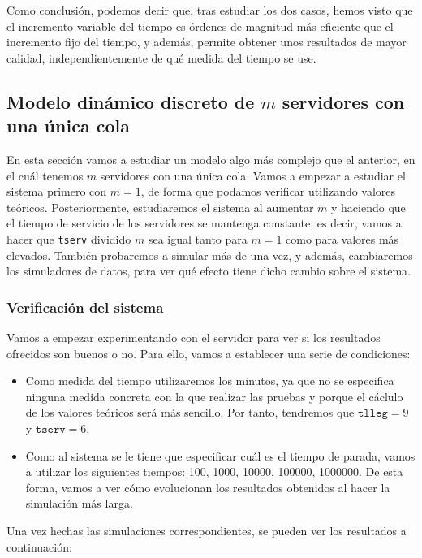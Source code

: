 \documentclass[11pt,a4paper]{article}
\begin{document}
Como conclusión, podemos decir que, tras estudiar los dos casos, hemos visto
que el incremento variable del tiempo es órdenes de magnitud más eficiente
que el incremento fijo del tiempo, y además, permite obtener unos resultados
de mayor calidad, independientemente de qué medida del tiempo se use.

\subsection{Modelo dinámico discreto de $m$ servidores con una única cola}

En esta sección vamos a estudiar un modelo algo más complejo que el anterior,
en el cuál tenemos $m$ servidores con una única cola. Vamos a empezar a estudiar
el sistema primero con $m=1$, de forma que podamos verificar utilizando valores
teóricos. Posteriormente, estudiaremos el sistema al aumentar $m$ y haciendo
que el tiempo de servicio de los servidores se mantenga constante; es decir,
vamos a hacer que \texttt{tserv} dividido $m$ sea igual tanto para $m=1$ como
para valores más elevados. También probaremos a simular más de una vez, y además,
cambiaremos los simuladores de datos, para ver qué efecto tiene dicho cambio
sobre el sistema.

\subsubsection{Verificación del sistema}

Vamos a empezar experimentando con el servidor para ver si los resultados
ofrecidos son buenos o no. Para ello, vamos a establecer una serie de condiciones:

\begin{itemize}[label=\textbullet]
	\item Como medida del tiempo utilizaremos los minutos, ya que no se especifica
	ninguna medida concreta con la que realizar las pruebas y porque el cáclulo de los
	valores teóricos será más sencillo. Por tanto, tendremos que $\texttt{tlleg} = 9$
	y $\texttt{tserv} = 6$.
	\item Como al sistema se le tiene que especificar cuál es el tiempo de parada,
	vamos a utilizar los siguientes tiempos: 100, 1000, 10000, 100000, 1000000. De
	esta forma, vamos a ver cómo evolucionan los resultados obtenidos al hacer la
	simulación más larga.
\end{itemize}

Una vez hechas las simulaciones correspondientes, se pueden ver los resultados
a continuación:
\end{document}

